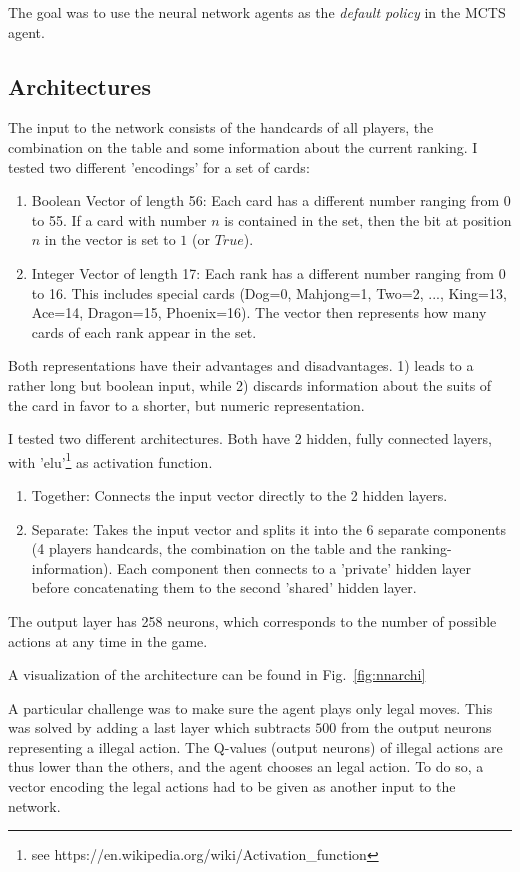The goal was to use the neural network agents as the \textit{default policy} in the MCTS agent.


\subsection{Architectures}
The input to the network consists of the handcards of all players, the combination on the table and some information about the current ranking.
I tested two different 'encodings' for a set of cards:
\begin{enumerate}
    \item Boolean Vector of length 56: Each card has a different number ranging from 0 to 55. If a card with number $n$ is contained in the set, then the bit at position $n$ in the vector is set to $1$ (or $True$).
    \item Integer Vector of length 17: Each rank has a different number ranging from 0 to 16. This includes special cards (Dog=0, Mahjong=1, Two=2, ..., King=13, Ace=14, Dragon=15, Phoenix=16). The vector then represents how many cards of each rank appear in the set.
\end{enumerate}

Both representations have their advantages and disadvantages. 1) leads to a rather long but boolean input, while 2) discards information about the suits of the card in favor to a shorter, but numeric representation.

I tested two different architectures. Both have 2 hidden, fully connected layers, with 'elu'\footnote{see https://en.wikipedia.org/wiki/Activation\_function}  as activation function.
\begin{enumerate}
    \item Together: Connects the input vector directly to the 2 hidden layers.
    \item Separate: Takes the input vector and splits it into the 6 separate components (4 players handcards, the combination on the table and the ranking-information). Each component then connects to a 'private' hidden layer before concatenating them to the second 'shared' hidden layer.
\end{enumerate}

The output layer has 258 neurons, which corresponds to the number of possible actions at any time in the game.

A visualization of the architecture can be found in Fig.~\ref{fig:nnarchi}

A particular challenge was to make sure the agent plays only legal moves. This was solved by adding a last layer which subtracts $500$ from the output neurons representing a illegal action. The Q-values (output neurons) of illegal actions are thus lower than the others, and the agent chooses an legal action. To do so, a vector encoding the legal actions had to be given as another input to the network.

